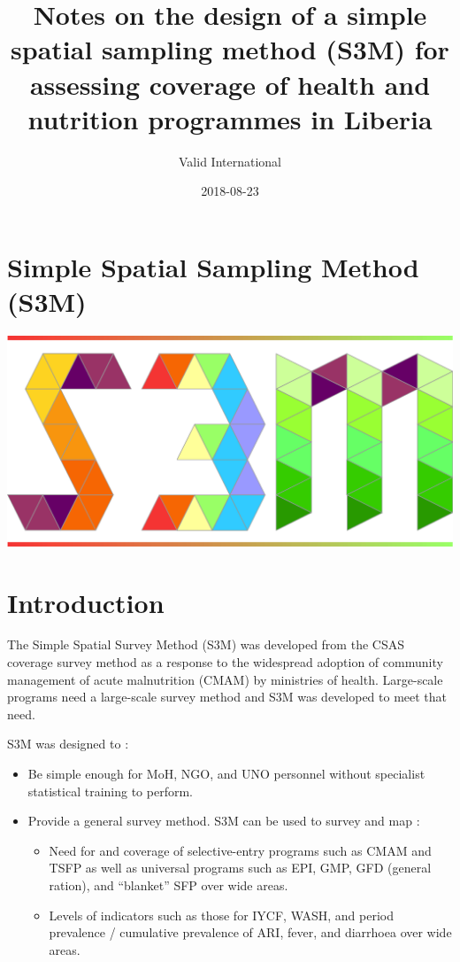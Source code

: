 \documentclass[12pt,a4paper]{book}
\title{Notes on the design of a simple spatial sampling method (S3M) for
assessing coverage of health and nutrition programmes in Liberia}
\author{Valid International}
\date{2018-08-23}
\theoremstyle{definition}
\theoremstyle{definition}
\theoremstyle{definition}
\theoremstyle{remark}
\begin{document}
\maketitle

{
\hypersetup{linkcolor=black}
\setcounter{tocdepth}{1}
\tableofcontents
}
\hypertarget{simple-spatial-sampling-method-s3m}{%
\chapter*{Simple Spatial Sampling Method
(S3M)}\label{simple-spatial-sampling-method-s3m}}

\includegraphics{figures/s3mlogo.png}

\hypertarget{introduction}{%
\chapter{Introduction}\label{introduction}}

The Simple Spatial Survey Method (S3M) was developed from the CSAS
coverage survey method as a response to the widespread adoption of
community management of acute malnutrition (CMAM) by ministries of
health. Large-scale programs need a large-scale survey method and S3M
was developed to meet that need.

S3M was designed to :

\begin{itemize}
\item
  Be simple enough for MoH, NGO, and UNO personnel without specialist
  statistical training to perform.
\item
  Provide a general survey method. S3M can be used to survey and map :

  \begin{itemize}
  \item
    Need for and coverage of selective-entry programs such as CMAM and
    TSFP as well as universal programs such as EPI, GMP, GFD (general
    ration), and ``blanket'' SFP over wide areas.
  \item
    Levels of indicators such as those for IYCF, WASH, and period
    prevalence / cumulative prevalence of ARI, fever, and diarrhoea over
    wide areas.
  \end{itemize}
\end{itemize}
\end{document}
